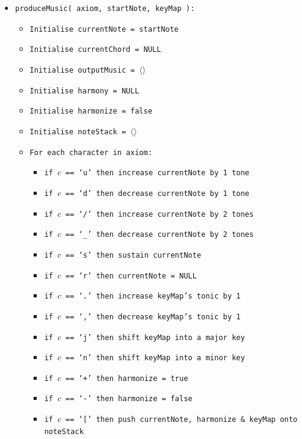 \begin{singlespace}
\begin{formality}
\begin{itemize}
	\item[\textbullet] \texttt{produceMusic( axiom, startNote, keyMap ):}
	\begin{itemize}
		\item[\textbullet] \texttt{Initialise currentNote = startNote}
		\item[\textbullet] \texttt{Initialise currentChord = NULL}
		\item[\textbullet] \texttt{Initialise outputMusic = $\langle$$\rangle$}
		\item[\textbullet] \texttt{Initialise harmony = NULL}
		\item[\textbullet] \texttt{Initialise harmonize = false}
		\item[\textbullet] \texttt{Initialise noteStack = $\langle$$\rangle$}
		\item[\textbullet] \texttt{For each character in axiom:}
		\begin{itemize}
			\item[\textbullet] \texttt{if $c$ == `u' then increase currentNote by 1 tone}
			\item[\textbullet] \texttt{if $c$ == `d' then decrease currentNote by 1 tone}
			\item[\textbullet] \texttt{if $c$ == `/' then increase currentNote by 2 tones}
			\item[\textbullet] \texttt{if $c$ == `\_' then decrease currentNote by 2 tones}
			\item[\textbullet] \texttt{if $c$ == `s' then sustain currentNote}
			\item[\textbullet] \texttt{if $c$ == `r' then currentNote = NULL}
			\item[\textbullet] \texttt{if $c$ == `.' then increase keyMap's tonic by 1}
			\item[\textbullet] \texttt{if $c$ == `,' then decrease keyMap's tonic by 1}
			\item[\textbullet] \texttt{if $c$ == `j' then shift keyMap into a major key}
			\item[\textbullet] \texttt{if $c$ == `n' then shift keyMap into a minor key}
			\item[\textbullet] \texttt{if $c$ == `+' then harmonize = true}
			\item[\textbullet] \texttt{if $c$ == `-' then harmonize = false}
			\item[\textbullet] \texttt{if $c$ == `[' then push currentNote, harmonize \& keyMap onto noteStack}

\end{itemize}
\end{itemize}
\end{itemize}
\end{formality}
\end{singlespace}
